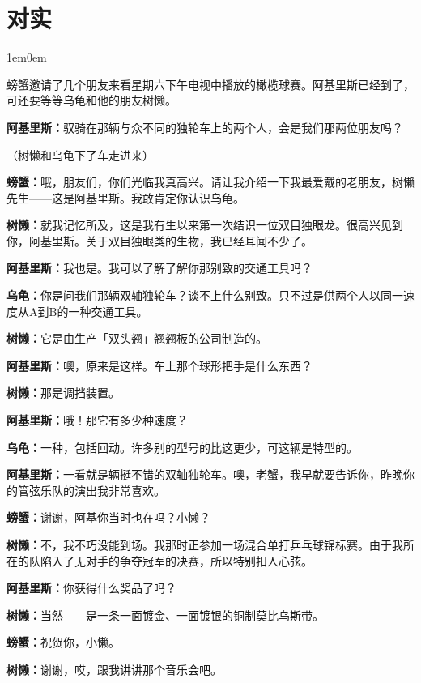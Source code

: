\documentclass[
  12pt,
  twoside,
  openright,
  oldfontcommands,
]{memoir}
\newcommand{\dialogname}[1]{{\heifamily\bfseries #1}}
\newenvironment{dialogguide}{%
  \begin{adjustwidth}{1em}{0em}\kaitifamily\itshape\small%
}{%
  \end{adjustwidth}%
}
\begin{document}
\label{Dialog19.xhtml}{}

\chapter*{对实}

\begin{dialogguide}
螃蟹邀请了几个朋友来看星期六下午电视中播放的橄榄球赛。阿基里斯已经到了，可还要等等乌龟和他的朋友树懒。
\end{dialogguide}

\dialogname{阿基里斯：}驭骑在那辆与众不同的独轮车上的两个人，会是我们那两位朋友吗？

（树懒和乌龟下了车走进来）

\dialogname{螃蟹：}哦，朋友们，你们光临我真高兴。请让我介绍一下我最爱戴的老朋友，树懒先生------这是阿基里斯。我敢肯定你认识乌龟。

\dialogname{树懒：}就我记忆所及，这是我有生以来第一次结识一位双目独眼龙。很高兴见到你，阿基里斯。关于双目独眼类的生物，我已经耳闻不少了。

\dialogname{阿基里斯：}我也是。我可以了解了解你那别致的交通工具吗？

\dialogname{乌龟：}你是问我们那辆双轴独轮车？谈不上什么别致。只不过是供两个人以同一速度从A到B的一种交通工具。

\dialogname{树懒：}它是由生产「双头翘」翘翘板的公司制造的。

\dialogname{阿基里斯：}噢，原来是这样。车上那个球形把手是什么东西？

\dialogname{树懒：}那是调挡装置。

\dialogname{阿基里斯：}哦！那它有多少种速度？

\dialogname{乌龟：}一种，包括回动。许多别的型号的比这更少，可这辆是特型的。

\dialogname{阿基里斯：}一看就是辆挺不错的双轴独轮车。噢，老蟹，我早就要告诉你，昨晚你的管弦乐队的演出我非常喜欢。

\dialogname{螃蟹：}谢谢，阿基你当时也在吗？小懒？

\dialogname{树懒：}不，我不巧没能到场。我那时正参加一场混合单打乒乓球锦标赛。由于我所在的队陷入了无对手的争夺冠军的决赛，所以特别扣人心弦。

\dialogname{阿基里斯：}你获得什么奖品了吗？

\dialogname{树懒：}当然------是一条一面镀金、一面镀银的铜制莫比乌斯带。

\dialogname{螃蟹：}祝贺你，小懒。

\dialogname{树懒：}谢谢，哎，跟我讲讲那个音乐会吧。
\end{document}
